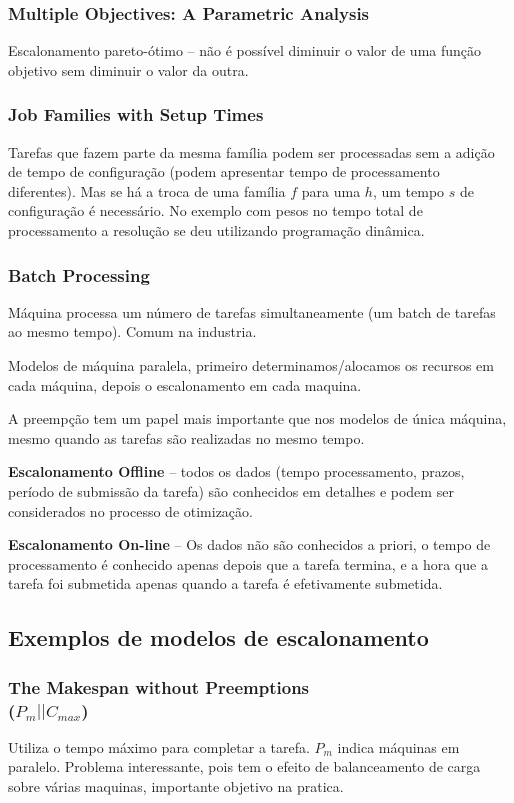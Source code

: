 \subsubsection{Multiple Objectives: A Parametric Analysis}
Escalonamento pareto-ótimo – não é possível diminuir o valor de uma função objetivo sem diminuir o valor da outra.
\\
\subsubsection{Job Families with Setup Times}
Tarefas que fazem parte da mesma família podem ser processadas sem a adição de tempo de configuração (podem apresentar tempo de processamento diferentes). Mas se há a troca de uma família $f$ para uma $h$, um tempo $s$ de configuração é necessário. No exemplo com pesos no tempo total de processamento a resolução se deu utilizando programação dinâmica.
\\
\subsubsection{Batch Processing}
Máquina processa um número de tarefas simultaneamente (um batch de tarefas ao mesmo tempo). Comum na industria. 

Modelos de máquina paralela, primeiro determinamos/alocamos os recursos em cada máquina, depois o escalonamento em cada maquina.

A preempção tem um papel mais importante que nos modelos de única máquina, mesmo quando as tarefas são realizadas no mesmo tempo. 

\textbf{Escalonamento Offline} – todos os dados (tempo processamento, prazos, período de submissão da tarefa) são conhecidos em detalhes e podem ser considerados no processo de otimização.

\textbf{Escalonamento On-line} – Os dados não são conhecidos a priori, o tempo de processamento é conhecido apenas depois que a tarefa termina, e a hora que a tarefa foi submetida apenas quando a tarefa é efetivamente submetida. \\


\subsection{Exemplos de modelos de escalonamento}
\subsubsection{The Makespan without Preemptions  \\($P_m || C_{max}$)}
	Utiliza o tempo máximo para completar a tarefa. $P_m$ indica máquinas em paralelo. Problema interessante, pois tem o efeito de balanceamento de carga sobre várias maquinas, importante objetivo na pratica.

